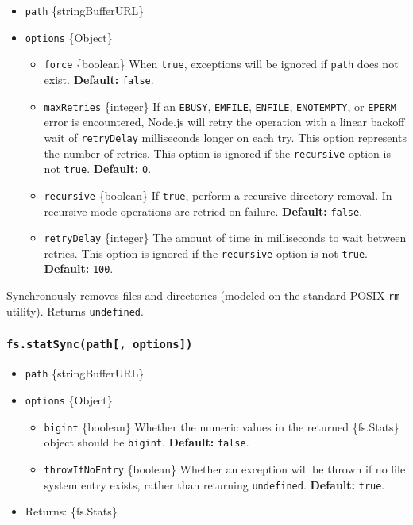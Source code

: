 \begin{itemize}
\tightlist
\item
  \texttt{path} \{string\textbar Buffer\textbar URL\}
\item
  \texttt{options} \{Object\}

  \begin{itemize}
  \tightlist
  \item
    \texttt{force} \{boolean\} When \texttt{true}, exceptions will be
    ignored if \texttt{path} does not exist. \textbf{Default:}
    \texttt{false}.
  \item
    \texttt{maxRetries} \{integer\} If an \texttt{EBUSY},
    \texttt{EMFILE}, \texttt{ENFILE}, \texttt{ENOTEMPTY}, or
    \texttt{EPERM} error is encountered, Node.js will retry the
    operation with a linear backoff wait of \texttt{retryDelay}
    milliseconds longer on each try. This option represents the number
    of retries. This option is ignored if the \texttt{recursive} option
    is not \texttt{true}. \textbf{Default:} \texttt{0}.
  \item
    \texttt{recursive} \{boolean\} If \texttt{true}, perform a recursive
    directory removal. In recursive mode operations are retried on
    failure. \textbf{Default:} \texttt{false}.
  \item
    \texttt{retryDelay} \{integer\} The amount of time in milliseconds
    to wait between retries. This option is ignored if the
    \texttt{recursive} option is not \texttt{true}. \textbf{Default:}
    \texttt{100}.
  \end{itemize}
\end{itemize}

Synchronously removes files and directories (modeled on the standard
POSIX \texttt{rm} utility). Returns \texttt{undefined}.

\subsubsection{\texorpdfstring{\texttt{fs.statSync(path{[},\ options{]})}}{fs.statSync(path{[}, options{]})}}\label{fs.statsyncpath-options}

\begin{itemize}
\tightlist
\item
  \texttt{path} \{string\textbar Buffer\textbar URL\}
\item
  \texttt{options} \{Object\}

  \begin{itemize}
  \tightlist
  \item
    \texttt{bigint} \{boolean\} Whether the numeric values in the
    returned \{fs.Stats\} object should be \texttt{bigint}.
    \textbf{Default:} \texttt{false}.
  \item
    \texttt{throwIfNoEntry} \{boolean\} Whether an exception will be
    thrown if no file system entry exists, rather than returning
    \texttt{undefined}. \textbf{Default:} \texttt{true}.
  \end{itemize}
\item
  Returns: \{fs.Stats\}
\end{itemize}

